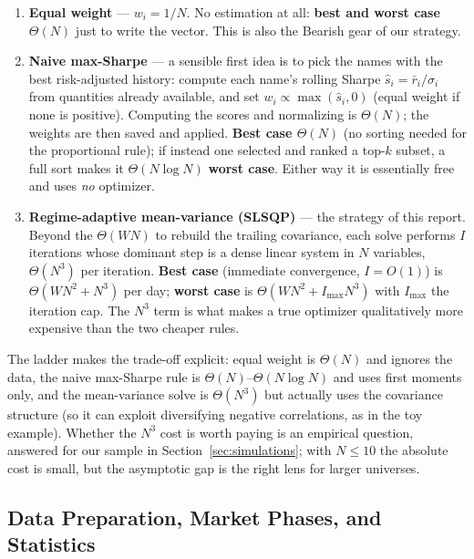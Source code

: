 \documentclass[a4paper,12pt]{article}
\begin{document}
\begin{enumerate}[label=\arabic*.]
    \item \textbf{Equal weight} --- $w_i=1/N$. No estimation at all: \textbf{best and worst case $\Theta(N)$} just to write the vector. This is also the Bearish gear of our strategy.
    \item \textbf{Naive max-Sharpe} --- a sensible first idea is to pick the names with the best risk-adjusted history: compute each name's rolling Sharpe $\widehat s_i=\bar r_i/\sigma_i$ from quantities already available, and set $w_i\propto\max(\widehat s_i,0)$ (equal weight if none is positive). Computing the scores and normalizing is $\Theta(N)$; the weights are then saved and applied. \textbf{Best case $\Theta(N)$} (no sorting needed for the proportional rule); if instead one selected and ranked a top-$k$ subset, a full sort makes it $\Theta(N\log N)$ \textbf{worst case}. Either way it is essentially free and uses \emph{no} optimizer.
    \item \textbf{Regime-adaptive mean-variance (SLSQP)} --- the strategy of this report. Beyond the $\Theta(W N)$ to rebuild the trailing covariance, each solve performs $I$ iterations whose dominant step is a dense linear system in $N$ variables, $\Theta(N^3)$ per iteration. \textbf{Best case} (immediate convergence, $I=O(1)$) is $\Theta(WN^2+N^3)$ per day; \textbf{worst case} is $\Theta(WN^2+I_{\max}N^3)$ with $I_{\max}$ the iteration cap. The $N^3$ term is what makes a true optimizer qualitatively more expensive than the two cheaper rules.
\end{enumerate}

The ladder makes the trade-off explicit: equal weight is $\Theta(N)$ and ignores the data, the naive max-Sharpe rule is $\Theta(N)$--$\Theta(N\log N)$ and uses first moments only, and the mean-variance solve is $\Theta(N^3)$ but actually uses the covariance structure (so it can exploit diversifying negative correlations, as in the toy example). Whether the $N^3$ cost is worth paying is an empirical question, answered for our sample in Section~\ref{sec:simulations}; with $N\le 10$ the absolute cost is small, but the asymptotic gap is the right lens for larger universes.

\subsection{Data Preparation, Market Phases, and Statistics}
\end{document}
